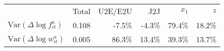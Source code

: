 \begin{tabular}{l r r r r r} 
\toprule 
 & Total & U2E/E2U & J2J & $x_1$ & $z$\\
 \cmidrule(lr){2-6}
$\text{Var}(\Delta\log f^a_{it})$ & 0.108 & -7.5\% & -4.3\% & 79.4\% & 18.2\%\\
$\text{Var}(\Delta\log w^a_{it}) $ & 0.005 & 86.3\% & 13.4\% & 39.3\% & 13.7\%\\
\bottomrule 
\end{tabular}
